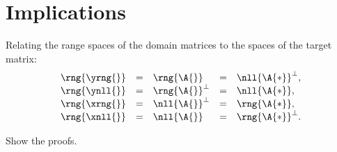 \section{Implications}
Relating the range spaces of the domain matrices to the spaces of the target matrix:
\begin{equation}
  \begin{array}{rclcl}
     \rng{\yrng{}} &=& \rng{\A{}} &=& \nll{\A{*}}^{\perp},\\
     \rng{\ynll{}} &=& \rng{\A{}}^{\perp} &=& \nll{\A{*}},\\
     \rng{\xrng{}} &=& \nll{\A{}}^{\perp} &=& \rng{\A{*}},\\
     \rng{\xnll{}} &=& \nll{\A{}} &=& \rng{\A{*}}^{\perp}.\\
  \end{array}
\end{equation}

Show the proofs.

\endinput
